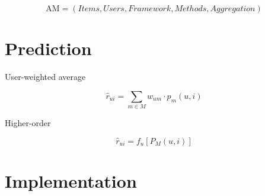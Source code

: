 \clearpage

\begin{equation*}
  \mathrm{AM} = (Items, Users, Framework, Methods, Aggregation)
\end{equation*}

\section{Prediction}

User-weighted average

\begin{equation*}
  \hat{r}_{ui} = \sum_{m \in M} w_{um} \cdot p_m(u,i)
\end{equation*}


Higher-order

\begin{equation*}
  \hat{r}_{ui} = f_{u}[ P_{M}(u,i) ]
\end{equation*}





\section{Implementation}      



